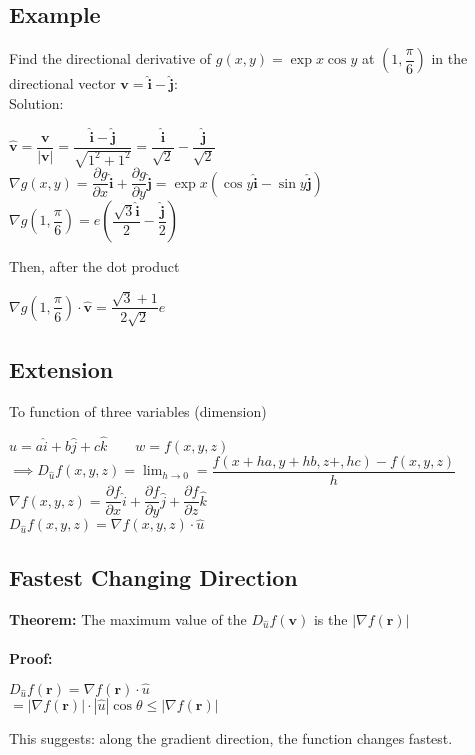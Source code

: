 \documentclass[UTF8,a4paper, 10pt, openany]{book}
\begin{document}
\subsection{Example}
Find the directional derivative of $g(x,y)=\exp{x}\cos y$ at $(1,\dfrac{\pi}{6})$ in the directional vector $\mathbf{v}=\mathbf{\hat{i}}-\mathbf{\hat{j}}$:\\
Solution:
\begin{center}
$\mathbf{\hat{v}}=\dfrac{\mathbf{v}}{|\mathbf{v}|}=\dfrac{\mathbf{\hat{i}}-\mathbf{\hat{j}}}{\sqrt{1^2+1^2}}=\dfrac{\mathbf{\hat{i}}}{\sqrt{2}}-\dfrac{\mathbf{\hat{j}}}{\sqrt{2}}$\\
$\nabla g(x,y)=\dfrac{\partial g}{\partial x}\mathbf{\hat{i}}+\dfrac{\partial g}{\partial y}\mathbf{\hat{j}}=\exp{x}(\cos y\mathbf{\hat{i}}-\sin y\mathbf{\hat{j}})$\\
$\nabla g(1,\dfrac{\pi}{6})=e (\dfrac{\sqrt{3}\mathbf{\hat{i}}}{2}-\dfrac{\mathbf{\hat{j}}}{2})$
\end{center}
Then, after the dot product
\begin{center}
$\nabla g(1,\dfrac{\pi}{6})\cdot \mathbf{\hat{v}}=\dfrac{\sqrt{3}+1}{2\sqrt{2}}e$
\end{center}
\subsection{Extension}
To function of three variables (dimension)
\begin{center}
$\hat{u}=a\hat{i}+b\hat{j}+c\hat{k} \qquad w=f(x,y,z)$\\
$\implies D_{\hat{u}}f(x,y,z)=\displaystyle\lim_{h\rightarrow 0}=\dfrac{f(x+ha,y+hb,z+,hc)-f(x,y,z)}{h}$\\
$\nabla f(x,y,z)=\dfrac{\partial f}{\partial x}\hat{i}+\dfrac{\partial f}{\partial y}\hat{j}+\dfrac{\partial f}{\partial z}\hat{k}$\\
$\boxed{D_{\hat{u}}f(x,y,z)=\nabla f(x,y,z)\cdot \hat{u}}$
\end{center}
\subsection{Fastest Changing Direction}
\textbf{Theorem: }The maximum value of the $D_{\hat{u}}f(\mathbf{v})$ is the $|\nabla f(\mathbf{r})|$\\ \\
\textbf{Proof: }\\
\begin{center}
$D_{\hat{u}}f(\mathbf{r})=\nabla f(\mathbf{r})\cdot \hat{u}$\\
$= |\nabla f(\mathbf{r})|\cdot |\hat{u}|\cos \theta \leq |\nabla f(\mathbf{r})|$
\end{center}
This suggests: along the gradient direction, the function changes fastest.
\end{document}
